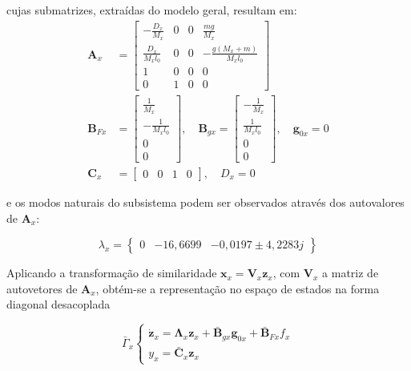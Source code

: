 \documentclass{ppgeesa}
\begin{document}
\noindent cujas submatrizes, extraídas do modelo geral, resultam em:
\begin{align*}
    \mathbf{A}_x &= \begin{bmatrix} -\frac{D_x}{M_x} & 0 & 0 & \frac{mg}{M_x} \\[6pt] \frac{D_x}{M_x l_0} & 0 & 0 & -\frac{g(M_x+m)}{M_x l_0} \\[6pt] 1 & 0 & 0 & 0 \\ 0 & 1 & 0 & 0 \end{bmatrix} \\
    \mathbf{B}_{Fx} &= \begin{bmatrix} \frac{1}{M_x} \\[6pt] -\frac{1}{M_x l_0} \\[6pt] 0 \\ 0 \end{bmatrix}, \quad
    \mathbf{B}_{gx} = \begin{bmatrix} -\frac{1}{M_x} \\[6pt] \frac{1}{M_x l_0} \\[6pt] 0 \\ 0 \end{bmatrix}, \quad
    \mathbf{g}_{0x} = 0 \\
    \mathbf{C}_x &= \begin{bmatrix} 0 & 0 & 1 & 0 \end{bmatrix}, \quad
    D_x = 0
\end{align*}

\noindent e os modos naturais do subsistema podem ser observados através dos autovalores de $\mathbf{A}_x$:

\begin{equation}
    \lambda_{x} = \begin{Bmatrix}
      0 & -16{,}6699 & -0{,}0197 \pm 4{,}2283j
    \end{Bmatrix}
\end{equation}

Aplicando a transformação de similaridade $\mathbf{x}_x = \mathbf{V}_x \mathbf{z}_x$, com $\mathbf{V}_x$ a matriz de autovetores de $\mathbf{A}_x$, obtém-se a representação no espaço de estados na forma diagonal desacoplada 

\begin{equation}
  \bar{\Gamma}_x
    \begin{cases}
      \dot{\mathbf{z}}_x = \mathbf{\Lambda}_x \mathbf{z}_x + \bar{\mathbf{B}}_{gx}\mathbf{g}_{0x} + \bar{\mathbf{B}}_{Fx} f_x\\
      y_x = \bar{\mathbf{C}}_x \mathbf{z}_x
  \end{cases}
\end{equation}
\end{document}
